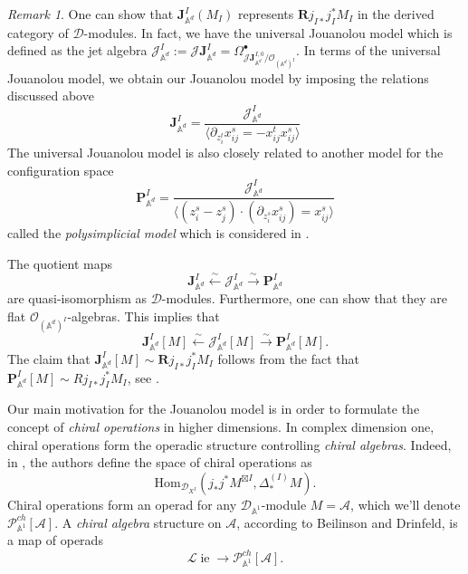 \documentclass[11pt]{amsart}
\theoremstyle{definition}
\theoremstyle{remark}
\newtheorem{rem}[thm]{Remark}
\numberwithin{equation}{section}
\newcommand{\R}{\mathbf{R}}
\renewcommand{\AA}{\mathbb{A}}
\newcommand{\op}{\operatorname}
\newcommand{\cA}{\mathcal{A}}
\newcommand{\cP}{\mathcal{P}}
\begin{document}
\begin{rem}
One can show that $\mathbf{J}_{\mathbb{A}^d}^{{I}}(M_{{I}})$ represents $\R j_{I*}j^*_IM_{I}$ in the derived category
of $\mathcal{D}$-modules. In fact, we have the universal Jouanolou model \cite[4.1.3. (ii)]{beilinson2004chiral} which
is defined as the jet algebra $\mathcal{J}_{\mathbb{A}^d}^{{I}}:=\mathscr{J}\mathbf{J}_{\mathbb{A}^d}^{{I}}
=\Omega^{\bullet}_{\mathscr{J}\mathbf{J}_{\mathbb{A}^d}^{{I},0}/\mathcal{O}_{(\mathbb{A}^d)^I}}$.
In terms of the universal Jouanolou model, we obtain our Jouanolou model by imposing the relations discussed above 
\[
\mathbf{J}_{\mathbb{A}^d}^{{I}}=\frac{\mathcal{J}_{\mathbb{A}^d}^{{I}}}{\langle \partial_{z^t_i}x^s_{ij}=-x^t_{ij}
x^s_{ij}\rangle}
\]
The universal Jouanolou model is also closely related to another model for the configuration space
\[
  \mathbf{P}_{\mathbb{A}^d}^{{I}}=\frac{\mathcal{J}_{\mathbb{A}^d}^{{I}}}{\langle (z^s_i-z^s_j)\cdot(\partial_{z^s_i}x^s_{ij})=x^s_{ij}\rangle}
  \]
  called the \textit{polysimplicial model} which is considered in \cite{FGY}.

The quotient maps
\[
\mathbf{J}_{\mathbb{A}^d}^{{I}}\xleftarrow{\sim}\mathcal{J}_{\mathbb{A}^d}^{{I}}\xrightarrow{\sim}\mathbf{P}_{\mathbb{A}^d}^{{I}}
\]
are quasi-isomorphism as $\mathcal{D}$-modules. 
Furthermore, one can show that they are flat $\mathcal{O}_{(\mathbb{A}^d)^I}$-algebras. This implies that
$$
\mathbf{J}_{\mathbb{A}^d}^{{I}}[M]\xleftarrow{\sim}\mathcal{J}_{\mathbb{A}^d}^{{I}}[M]\xrightarrow{\sim}\mathbf{P}_{\mathbb{A}^d}^{{I}}[M].
$$
The claim that  $\mathbf{J}_{\mathbb{A}^d}^{{I}}[M]\sim \R j_{I*}j^*_IM_{I}$ follows from the fact that $\mathbf{P}
_{\mathbb{A}^d}^{{I}}[M]\sim Rj_{I*}j^*_IM_{I}$, see \cite{FGY}.
  \end{rem}
    
  Our main motivation for the Jouanolou model is in order to formulate the concept of \textit{chiral operations} in
  higher dimensions.
  In complex dimension one, chiral operations form the operadic structure controlling \textit{chiral
  algebras}. 
  Indeed, in \cite{beilinson2004chiral}, the authors define the space of chiral operations as
    $$
    \mathrm{Hom}_{\mathcal{D}_{X^{{I}}}}\left(j_{*}j^*M^{\boxtimes{I}},\Delta^{(I)}_*M\right).
    $$
    Chiral operations form an operad for any $\mathcal{D}_{\mathbb{A}^1}$-module $M=\cA$, which we'll denote $\mathcal{P}
    _{\AA^1}^{ch}[\cA]$.
    A \textit{chiral algebra} structure on $\cA$, according to Beilinson and Drinfeld, is a map of operads 
    \begin{equation}\label{}
      \mathcal{L}\!\op{ie} \to \cP_{\AA^1}^{ch}[\cA] . 
    \end{equation}
\end{document}
